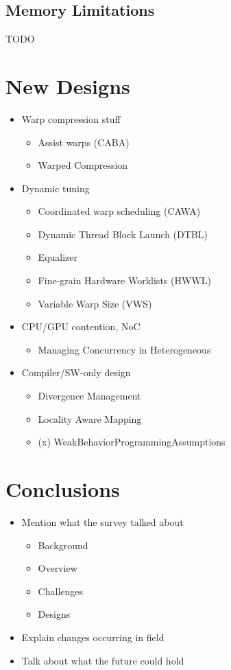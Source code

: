 \documentclass[prodmode,acmtecs]{acmsmall} %
\begin{document}
\subsection{Memory Limitations}
TODO

\section{New Designs} \label{sec:research}
\begin{itemize}
\item Warp compression stuff
  \begin{itemize}
  \item Assist warps (CABA)
  \item Warped Compression
  \end{itemize}
\item Dynamic tuning
  \begin{itemize}
  \item Coordinated warp scheduling (CAWA)
  \item Dynamic Thread Block Launch (DTBL)
  \item Equalizer
  \item Fine-grain Hardware Worklists (HWWL)
  \item Variable Warp Size (VWS)
  \end{itemize}
\item CPU/GPU contention, NoC
  \begin{itemize}
  \item Managing Concurrency in Heterogeneous
  \end{itemize}
\item Compiler/SW-only design
  \begin{itemize}
  \item Divergence Management
  \item Locality Aware Mapping
  \item (x) WeakBehaviorProgrammingAssumptions
  \end{itemize}
\end{itemize}

\section{Conclusions} \label{sec:conclusions}
\begin{itemize}
\item Mention what the survey talked about
  \begin{itemize}
  \item Background
  \item Overview
  \item Challenges
  \item Designs
  \end{itemize}
\item Explain changes occurring in field
\item Talk about what the future could hold
\end{itemize}
\end{document}
